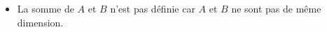 \documentclass[12pt,a4paper]{book}
\numberwithin{definition}{chapter}
\theoremstyle{plain}
\begin{document}
\begin{example}
\begin{itemize}
\begin{equation*}
\begin{bmatrix}
					1 & 3  & -1
				\end{bmatrix}+
				\begin{bmatrix}
					1 & 1 & 0\\
					2 & 0 & 4
				\end{bmatrix}=
				\begin{bmatrix}
					-2+1 & 0+1 & 1+0\\
					1+2 & 3+0 & -1+4
				\end{bmatrix}=
				\begin{bmatrix}
					-1 & 1 & 1\\
					3 & 3 & 3
				\end{bmatrix}.
			\end{equation*}
			\item[\ding{43}]  La somme de $A$ et $B$ n’est pas définie car $A$ et $B$ ne sont pas de même dimension.
		\end{itemize}
	\end{example}
\end{document}
